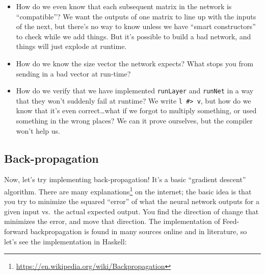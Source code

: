 \documentclass[]{article}
\renewcommand{\href}[2]{#2\footnote{\url{#1}}}
\begin{document}
\begin{itemize}
\item
  How do we even know that each subsequent matrix in the network is
  ``compatible''? We want the outputs of one matrix to line up with the
  inputs of the next, but there's no way to know unless we have ``smart
  constructors'' to check while we add things. But it's possible to
  build a bad network, and things will just explode at runtime.
\item
  How do we know the size vector the network expects? What stops you
  from sending in a bad vector at run-time?
\item
  How do we verify that we have implemented \texttt{runLayer} and
  \texttt{runNet} in a way that they won't suddenly fail at runtime? We
  write \texttt{l\ \#\textgreater{}\ v}, but how do we know that it's
  even correct\ldots{}what if we forgot to multiply something, or used
  something in the wrong places? We can it prove ourselves, but the
  compiler won't help us.
\end{itemize}

\subsection{Back-propagation}\label{back-propagation}

Now, let's try implementing back-propagation! It's a basic ``gradient
descent'' algorithm. There are
\href{https://en.wikipedia.org/wiki/Backpropagation}{many explanations}
on the internet; the basic idea is that you try to minimize the squared
``error'' of what the neural network outputs for a given input vs.~the
actual expected output. You find the direction of change that minimizes
the error, and move that direction. The implementation of Feed-forward
backpropagation is found in many sources online and in literature, so
let's see the implementation in Haskell:
\end{document}
